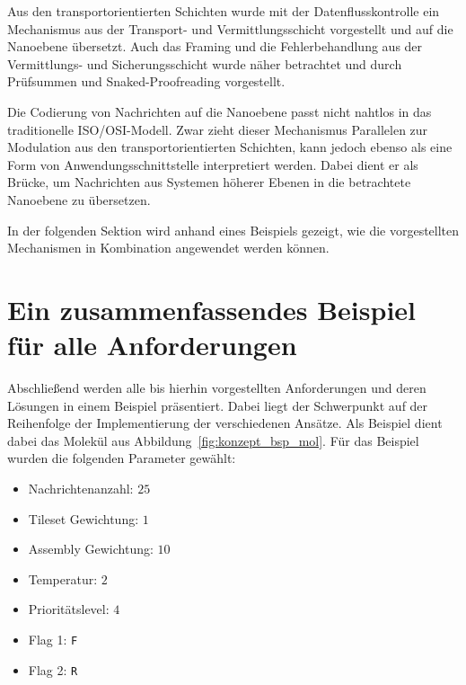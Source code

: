 Aus den transportorientierten Schichten wurde mit der Datenflusskontrolle ein Mechanismus aus der Transport- und Vermittlungsschicht vorgestellt und auf die Nanoebene übersetzt. Auch das Framing und die Fehlerbehandlung aus der Vermittlungs- und Sicherungsschicht wurde näher betrachtet und durch Prüfsummen und Snaked-Proofreading vorgestellt.

Die Codierung von Nachrichten auf die Nanoebene passt nicht nahtlos in das traditionelle ISO/OSI-Modell. Zwar zieht dieser Mechanismus Parallelen zur Modulation aus den transportorientierten Schichten, kann jedoch ebenso als eine Form von Anwendungsschnittstelle interpretiert werden. Dabei dient er als Brücke, um Nachrichten aus Systemen höherer Ebenen in die betrachtete Nanoebene zu übersetzen.

In der folgenden Sektion wird anhand eines Beispiels gezeigt, wie die vorgestellten Mechanismen in Kombination angewendet werden können.

\section{Ein zusammenfassendes Beispiel für alle Anforderungen}

Abschließend werden alle bis hierhin vorgestellten Anforderungen und deren Lösungen in einem Beispiel präsentiert. 
Dabei liegt der Schwerpunkt auf der Reihenfolge der Implementierung der verschiedenen Ansätze.
Als Beispiel dient dabei das Molekül aus Abbildung~\ref{fig:konzept_bsp_mol}. Für das Beispiel wurden die folgenden Parameter gewählt: 
\begin{itemize}
    \item Nachrichtenanzahl: $25$
    \item Tileset Gewichtung: $1$
    \item Assembly Gewichtung: $10$
    \item Temperatur: $2$
    \item Prioritätslevel: $4$
    \item Flag 1: \texttt{F}
    \item Flag 2: \texttt{R}
\end{itemize}


